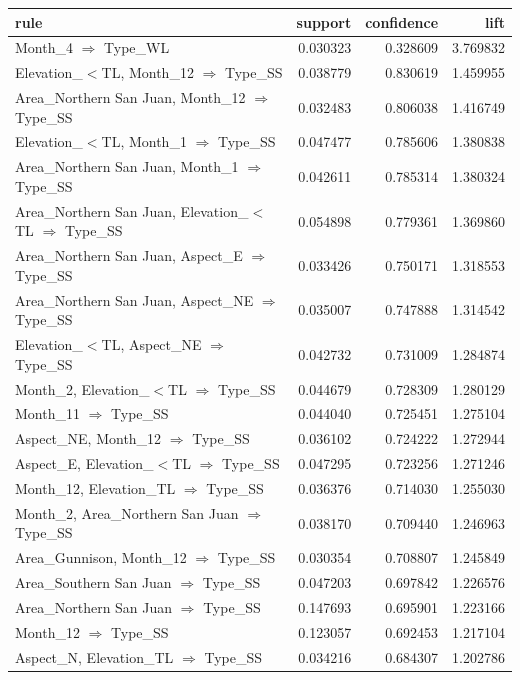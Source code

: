\begin{tabular}{lrrr}
\toprule
rule & support & confidence & lift \\
\midrule
Month\_4 $\Rightarrow$ Type\_WL & 0.030323 & 0.328609 & 3.769832 \\
Elevation\_$<$TL, Month\_12 $\Rightarrow$ Type\_SS & 0.038779 & 0.830619 & 1.459955 \\
Area\_Northern San Juan, Month\_12 $\Rightarrow$ Type\_SS & 0.032483 & 0.806038 & 1.416749 \\
Elevation\_$<$TL, Month\_1 $\Rightarrow$ Type\_SS & 0.047477 & 0.785606 & 1.380838 \\
Area\_Northern San Juan, Month\_1 $\Rightarrow$ Type\_SS & 0.042611 & 0.785314 & 1.380324 \\
Area\_Northern San Juan, Elevation\_$<$TL $\Rightarrow$ Type\_SS & 0.054898 & 0.779361 & 1.369860 \\
Area\_Northern San Juan, Aspect\_E $\Rightarrow$ Type\_SS & 0.033426 & 0.750171 & 1.318553 \\
Area\_Northern San Juan, Aspect\_NE $\Rightarrow$ Type\_SS & 0.035007 & 0.747888 & 1.314542 \\
Elevation\_$<$TL, Aspect\_NE $\Rightarrow$ Type\_SS & 0.042732 & 0.731009 & 1.284874 \\
Month\_2, Elevation\_$<$TL $\Rightarrow$ Type\_SS & 0.044679 & 0.728309 & 1.280129 \\
Month\_11 $\Rightarrow$ Type\_SS & 0.044040 & 0.725451 & 1.275104 \\
Aspect\_NE, Month\_12 $\Rightarrow$ Type\_SS & 0.036102 & 0.724222 & 1.272944 \\
Aspect\_E, Elevation\_$<$TL $\Rightarrow$ Type\_SS & 0.047295 & 0.723256 & 1.271246 \\
Month\_12, Elevation\_TL $\Rightarrow$ Type\_SS & 0.036376 & 0.714030 & 1.255030 \\
Month\_2, Area\_Northern San Juan $\Rightarrow$ Type\_SS & 0.038170 & 0.709440 & 1.246963 \\
Area\_Gunnison, Month\_12 $\Rightarrow$ Type\_SS & 0.030354 & 0.708807 & 1.245849 \\
Area\_Southern San Juan $\Rightarrow$ Type\_SS & 0.047203 & 0.697842 & 1.226576 \\
Area\_Northern San Juan $\Rightarrow$ Type\_SS & 0.147693 & 0.695901 & 1.223166 \\
Month\_12 $\Rightarrow$ Type\_SS & 0.123057 & 0.692453 & 1.217104 \\
Aspect\_N, Elevation\_TL $\Rightarrow$ Type\_SS & 0.034216 & 0.684307 & 1.202786 \\

\end{tabular}
